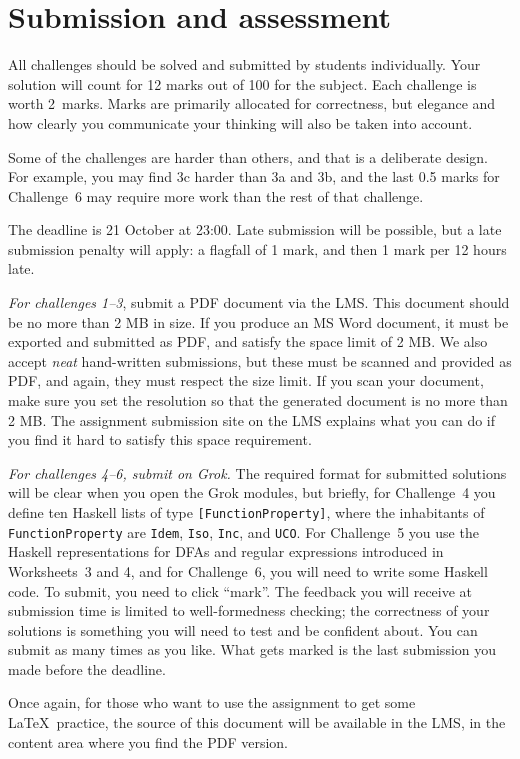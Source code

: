 \documentclass[12pt]{article}
\begin{document}
\section*{Submission and assessment}
All challenges should be solved and submitted by students individually.
Your solution will count for 12 marks out of 100 for the subject.
Each challenge is worth 2~marks.
Marks are primarily allocated for correctness, but elegance and how
clearly you communicate your thinking will also be taken into account.

Some of the challenges are harder than others, and that is a 
deliberate design.
For example, you may find 3c harder than 3a and 3b, and the last
0.5 marks for Challenge~6 may require more work than the rest of
that challenge.

The deadline is 21 October at 23:00.
Late submission will be possible, but a late submission penalty will
apply: a flagfall of 1 mark, and then 1 mark per 12 hours late.

\emph{For challenges 1--3}, submit a PDF document via the LMS.
This document should be no more than 2 MB in size.
If you produce an MS Word document, it must be exported
and submitted as PDF, and satisfy the space limit of 2 MB.
We also accept \emph{neat} hand-written submissions, but these must be
scanned and provided as PDF, and again, they must respect the size limit.
If you scan your document, make sure you set the resolution so that
the generated document is no more than 2 MB.
The assignment submission site on the LMS explains what you can do
if you find it hard to satisfy this space requirement.

\emph{For challenges 4--6, submit on Grok.}
The required format for submitted solutions will be clear when you
open the Grok modules, but briefly,
for Challenge~4 you define ten Haskell lists of type 
\verb![FunctionProperty]!,
where the inhabitants of \verb!FunctionProperty! are 
\verb!Idem!, \verb!Iso!, \verb!Inc!, and \verb!UCO!.
For Challenge~5 you use the
Haskell representations for DFAs and regular expressions 
introduced in Worksheets~3 and 4, and for Challenge~6, 
you will need to write some Haskell code.
To submit, you need to click ``mark''.
The feedback you will receive at submission time is limited to 
well-formedness checking; the correctness of your solutions is
something you will need to test and be confident about.
You can submit as many times as you like.
What gets marked is the last submission you made before the deadline.

Once again, for those who want to use the assignment to
get some \LaTeX\ practice, the source of this document will be 
available in the LMS,
in the content area where you find the PDF version.
\end{document}
